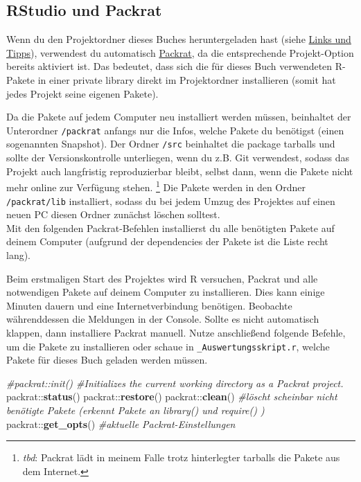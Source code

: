\documentclass[]{book}
\makeatletter
\newenvironment{Shaded}{\begin{snugshade}}{\end{snugshade}}
\newcommand{\KeywordTok}[1]{\textcolor[rgb]{0.13,0.29,0.53}{\textbf{{#1}}}}
\newcommand{\CommentTok}[1]{\textcolor[rgb]{0.56,0.35,0.01}{\textit{{#1}}}}
\newcommand{\NormalTok}[1]{{#1}}
\let\rmarkdownfootnote\footnote%
\def\footnote{\protect\rmarkdownfootnote}
\newenvironment{kframe}{%
\medskip{}
\setlength{\fboxsep}{.8em}
 \def\at@end@of@kframe{}%
 \ifinner\ifhmode%
  \def\at@end@of@kframe{\end{minipage}}%
  \begin{minipage}{\columnwidth}%
 \fi\fi%
 \def\FrameCommand##1{\hskip\@totalleftmargin \hskip-\fboxsep
 \colorbox{shadecolor}{##1}\hskip-\fboxsep
     \hskip-\linewidth \hskip-\@totalleftmargin \hskip\columnwidth}%
 \MakeFramed {\advance\hsize-\width
   \@totalleftmargin\z@ \linewidth\hsize
   \@setminipage}}%
 {\par\unskip\endMakeFramed%
 \at@end@of@kframe}
\renewenvironment{Shaded}{\begin{kframe}}{\end{kframe}}
\theoremstyle{definition}
\theoremstyle{definition}
\theoremstyle{remark}
\let\BeginKnitrBlock\begin \let\EndKnitrBlock\end
\makeatother
\begin{document}
\hypertarget{rstudio-und-packrat}{\subsection*{RStudio und
Packrat}\label{rstudio-und-packrat}}

Wenn du den Projektordner dieses Buches heruntergeladen hast (siehe
\protect\hyperlink{links-und-tipps}{Links und Tipps}), verwendest du
automatisch \href{https://rstudio.github.io/packrat/}{Packrat}, da die
entsprechende Projekt-Option bereits aktiviert ist. Das bedeutet, dass
sich die für dieses Buch verwendeten R-Pakete in einer private library
direkt im Projektordner installieren (somit hat jedes Projekt seine
eigenen Pakete).

Da die Pakete auf jedem Computer neu installiert werden müssen,
beinhaltet der Unterordner \texttt{/packrat} anfangs nur die Infos,
welche Pakete du benötigst (einen sogenannten Snapshot). Der Ordner
\texttt{/src} beinhaltet die package tarballs und sollte der
Versionskontrolle unterliegen, wenn du z.B. Git verwendest, sodass das
Projekt auch langfristig reproduzierbar bleibt, selbst dann, wenn die
Pakete nicht mehr online zur Verfügung stehen. \footnote{\emph{tbd}:
  Packrat lädt in meinem Falle trotz hinterlegter tarballs die Pakete
  aus dem Internet.} Die Pakete werden in den Ordner
\texttt{/packrat/lib} installiert, sodass du bei jedem Umzug des
Projektes auf einen neuen PC diesen Ordner zunächst löschen solltest.\\
Mit den folgenden Packrat-Befehlen installierst du alle benötigten
Pakete auf deinem Computer (aufgrund der dependencies der Pakete ist die
Liste recht lang).

\BeginKnitrBlock{rmdcaution}
Beim erstmaligen Start des Projektes wird R versuchen, Packrat und alle
notwendigen Pakete auf deinem Computer zu installieren. Dies kann einige
Minuten dauern und eine Internetverbindung benötigen. Beobachte
währenddessen die Meldungen in der Console. Sollte es nicht automatisch
klappen, dann installiere Packrat manuell. Nutze anschließend folgende
Befehle, um die Pakete zu installieren oder schaue in
\texttt{\_Auswertungsskript.r}, welche Pakete für dieses Buch geladen
werden müssen.
\EndKnitrBlock{rmdcaution}

\begin{Shaded}
\begin{Highlighting}[]
\CommentTok{#packrat::init()  #Initializes the current working directory as a Packrat project.}
\NormalTok{packrat::}\KeywordTok{status}\NormalTok{()}
\NormalTok{packrat::}\KeywordTok{restore}\NormalTok{()}
\NormalTok{packrat::}\KeywordTok{clean}\NormalTok{() }\CommentTok{#löscht scheinbar nicht benötigte Pakete (erkennt Pakete an library() und require() )}
\NormalTok{packrat::}\KeywordTok{get_opts}\NormalTok{()  }\CommentTok{#aktuelle Packrat-Einstellungen}
\end{Highlighting}
\end{Shaded}
\end{document}
